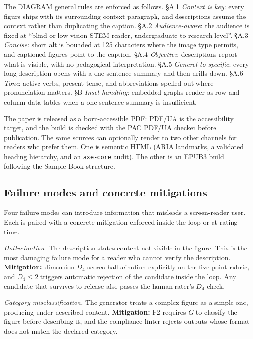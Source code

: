 \documentclass[pdflatex,sn-mathphys-num]{sn-jnl}
\begin{document}
The DIAGRAM general rules \cite{diagramGuidelines2019} are enforced as follows. \S A.1 \emph{Context is key}: every figure ships with its surrounding context paragraph, and descriptions assume the context rather than duplicating the caption. \S A.2 \emph{Audience-aware}: the audience is fixed at ``blind or low-vision STEM reader, undergraduate to research level''. \S A.3 \emph{Concise}: short alt is bounded at 125 characters where the image type permits, and captioned figures point to the caption. \S A.4 \emph{Objective}: descriptions report what is visible, with no pedagogical interpretation. \S A.5 \emph{General to specific}: every long description opens with a one-sentence summary and then drills down. \S A.6 \emph{Tone}: active verbs, present tense, and abbreviations spelled out where pronunciation matters. \S B \emph{Inset handling}: embedded graphs render as row-and-column data tables when a one-sentence summary is insufficient.

The paper is released as a born-accessible PDF: PDF/UA is the accessibility target, and the build is checked with the PAC PDF/UA checker before publication. The same sources can optionally render to two other channels for readers who prefer them. One is semantic HTML (ARIA landmarks, a validated heading hierarchy, and an \texttt{axe-core} audit). The other is an EPUB3 build following the Sample Book structure.

\subsection{Failure modes and concrete mitigations}\label{subsec:mitigations}

Four failure modes can introduce information that misleads a screen-reader user. Each is paired with a concrete mitigation enforced inside the loop or at rating time.

\emph{Hallucination.} The description states content not visible in the figure. This is the most damaging failure mode for a reader who cannot verify the description. \textbf{Mitigation:} dimension $D_4$ scores hallucination explicitly on the five-point rubric, and $D_4 \leq 2$ triggers automatic rejection of the candidate inside the loop. Any candidate that survives to release also passes the human rater's $D_4$ check.

\emph{Category misclassification.} The generator treats a complex figure as a simple one, producing under-described content. \textbf{Mitigation:} P2 requires $G$ to classify the figure before describing it, and the compliance linter rejects outputs whose format does not match the declared category.
\end{document}

